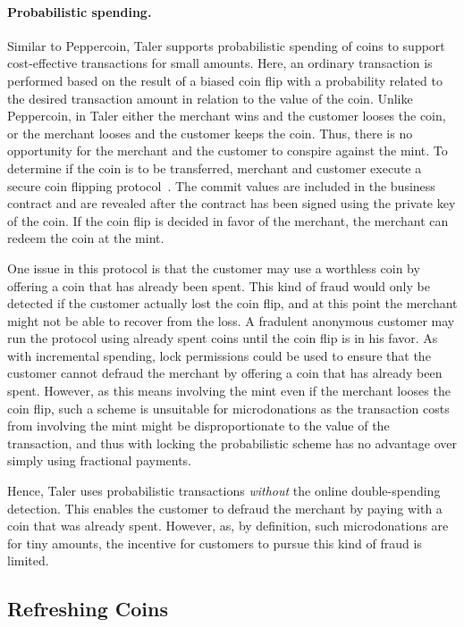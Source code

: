 \documentclass{llncs}
\begin{document}
\paragraph{Probabilistic spending.}

Similar to Peppercoin, Taler supports probabilistic spending of coins to
support cost-effective transactions for small amounts.  Here, an
ordinary transaction is performed based on the result of a biased coin
flip with a probability related to the desired transaction amount in
relation to the value of the coin.  Unlike Peppercoin, in Taler either
the merchant wins and the customer looses the coin, or the merchant
looses and the customer keeps the coin.  Thus, there is no opportunity
for the merchant and the customer to conspire against the mint.  To
determine if the coin is to be transferred, merchant and customer
execute a secure coin flipping protocol~\cite{blum1981}.  The commit
values are included in the business contract and are revealed after
the contract has been signed using the private key of the coin.  If
the coin flip is decided in favor of the merchant, the merchant can
redeem the coin at the mint.

One issue in this protocol is that the customer may use a worthless
coin by offering a coin that has already been spent.  This kind of
fraud would only be detected if the customer actually lost the coin
flip, and at this point the merchant might not be able to recover from
the loss.  A fradulent anonymous customer may run the protocol using
already spent coins until the coin flip is in his favor.  As with
incremental spending, lock permissions could be used to ensure that
the customer cannot defraud the merchant by offering a coin that has
already been spent.  However, as this means involving the mint even if
the merchant looses the coin flip, such a scheme is unsuitable for
microdonations as the transaction costs from involving the mint might
be disproportionate to the value of the transaction, and thus with
locking the probabilistic scheme has no advantage over simply using
fractional payments.

Hence, Taler uses probabilistic transactions {\em without} the online
double-spending detection.  This enables the customer to defraud the
merchant by paying with a coin that was already spent.  However, as,
by definition, such microdonations are for tiny amounts, the incentive
for customers to pursue this kind of fraud is limited.


\subsection{Refreshing Coins}
\end{document}
